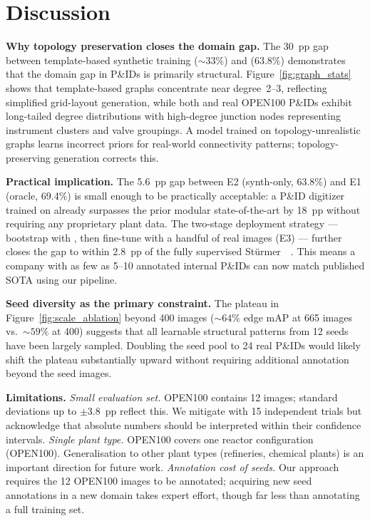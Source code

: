 
\section{Discussion}
\label{sec:discussion}

\noindent\textbf{Why topology preservation closes the domain gap.}
The 30~pp gap between template-based synthetic training (${\sim}33\%$)
and \ours{} (63.8\%) demonstrates that the domain gap in P\&IDs is
primarily structural.
Figure~\ref{fig:graph_stats} shows that template-based graphs concentrate
near degree~2--3, reflecting simplified grid-layout generation, while
both \ours{} and real OPEN100 P\&IDs exhibit long-tailed degree
distributions with high-degree junction nodes representing instrument
clusters and valve groupings.
A model trained on topology-unrealistic graphs learns incorrect priors
for real-world connectivity patterns; topology-preserving generation
corrects this.

\noindent\textbf{Practical implication.}
The 5.6~pp gap between E2 (synth-only, 63.8\%) and E1 (oracle, 69.4\%)
is small enough to be practically acceptable: a P\&ID digitizer trained
on \ours{} already surpasses the prior modular state-of-the-art by 18~pp
without requiring any proprietary plant data.
The two-stage deployment strategy --- bootstrap with \ours{}, then
fine-tune with a handful of real images (E3) --- further closes the gap
to within 2.8~pp of the fully supervised
Stürmer~\etal~\cite{sturmer2025}.
This means a company with as few as 5--10 annotated internal P\&IDs can
now match published SOTA using our pipeline.

\noindent\textbf{Seed diversity as the primary constraint.}
The plateau in Figure~\ref{fig:scale_ablation} beyond 400 images
(${\sim}64\%$ edge mAP at 665 images vs.\ ${\sim}59\%$ at 400) suggests
that all learnable structural patterns from 12 seeds have been largely
sampled.
Doubling the seed pool to 24 real P\&IDs would likely shift the plateau
substantially upward without requiring additional annotation beyond the
seed images.

\noindent\textbf{Limitations.}
\textit{Small evaluation set.} OPEN100 contains 12 images; standard
deviations up to $\pm$3.8~pp reflect this.
We mitigate with 15 independent trials but acknowledge that absolute
numbers should be interpreted within their confidence intervals.
\textit{Single plant type.} OPEN100 covers one reactor configuration
(OPEN100).
Generalisation to other plant types (refineries, chemical plants) is
an important direction for future work.
\textit{Annotation cost of seeds.} Our approach requires the 12 OPEN100
images to be annotated; acquiring new seed annotations in a new domain
takes expert effort, though far less than annotating a full training set.
